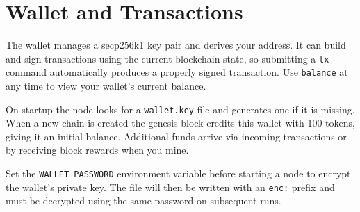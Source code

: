 \chapter{Wallet and Transactions}
The wallet manages a secp256k1 key pair and derives your address. It can build and sign transactions using the current blockchain state, so submitting a \texttt{tx} command automatically produces a properly signed transaction. Use \texttt{balance} at any time to view your wallet's current balance.

On startup the node looks for a \texttt{wallet.key} file and generates one if it is missing. When a new chain is created the genesis block credits this wallet with 100 tokens, giving it an initial balance. Additional funds arrive via incoming transactions or by receiving block rewards when you mine.

Set the \texttt{WALLET\_PASSWORD} environment variable before starting a node to encrypt the wallet's private key. The file will then be written with an \texttt{enc:} prefix and must be decrypted using the same password on subsequent runs.
